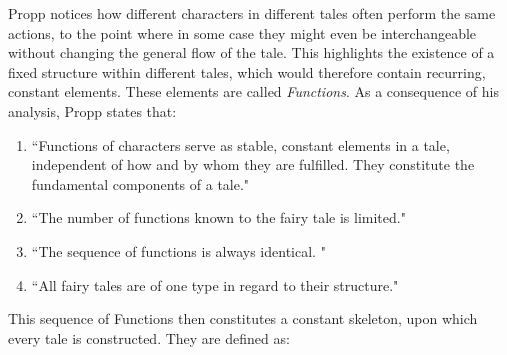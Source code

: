 \documentclass[12pt,a4paper,oneside]{report}
\begin{document}
Propp notices how different characters in different tales often perform the same actions, to the point where in some case they might even be interchangeable without changing the general flow of the tale. This highlights the existence of a fixed structure within different tales, which would therefore contain recurring, constant elements. These elements are called \textit{Functions}. As a consequence of his analysis, Propp states that:

\begin{enumerate}\setlength{\itemsep}{0pt}
\item ``Functions of characters serve as stable, constant elements in a tale, independent of how and by whom they are fulfilled. They constitute the fundamental components of a tale."
\item ``The number of functions known to the fairy tale is limited."
\item ``The sequence of functions is always identical. "
\item ``All fairy tales are of one type in regard to their structure."
\end{enumerate}

This sequence of Functions then constitutes a constant skeleton, upon which every tale is constructed. They are defined as:
\end{document}
